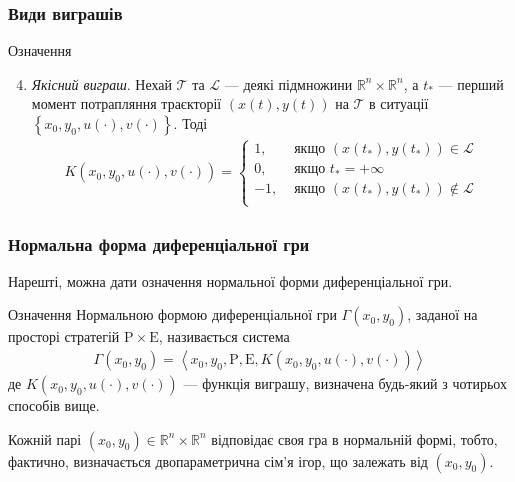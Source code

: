 \documentclass[10pt,pdf,aspectratio=169]{beamer}
\newcommand{\R}{\mathbb{R}}
\newcommand{\T}{\mathcal{T}}
\renewcommand{\l}{\left}
\renewcommand{\r}{\right}
\begin{document}
    \begin{frame}
        \frametitle{Види виграшів}
    
        \begin{block}{Означення}
            \begin{enumerate}
                \setcounter{enumi}{3}
                \item \emph{Якісний виграш}. Нехай $\T$ та $\mathcal{L}$ --- деякі підмножини $\R^n \times \R^n$, а $t_*$ --- перший момент потрапляння траєкторії $(x(t), y(t))$ на $\T$
                в ситуації $\l\{x_0, y_0, u(\cdot), v(\cdot) \r\}$. Тоді
                \begin{gather*}
                    K(x_0, y_0, u(\cdot), v(\cdot)) = \begin{cases}
                        1, & \text{ якщо } (x(t_*), y(t_*)) \in \mathcal{L} \\
                        0, & \text{ якщо } t_* = +\infty \\
                        -1, & \text{ якщо } (x(t_*), y(t_*)) \notin \mathcal{L} \\
                    \end{cases}
                \end{gather*}
            \end{enumerate}
        \end{block}
    \end{frame}
    \begin{frame}
        \frametitle{Нормальна форма диференціальної гри}
    
        Нарешті, можна дати означення нормальної форми диференціальної гри.

        \begin{block}{Означення}
            Нормальною формою диференціальної гри $\Gamma (x_0, y_0)$, заданої на просторі стратегій $\mathrm{P} \times \mathrm{E}$, називається система
            \begin{gather*}
                \Gamma (x_0, y_0) = \l<x_0, y_0, \mathrm {P}, \mathrm{E}, K(x_0, y_0, u(\cdot), v(\cdot)) \r>
            \end{gather*}
            де $K(x_0, y_0, u(\cdot), v(\cdot))$ --- функція виграшу, визначена будь-який з чотирьох способів вище.
        \end{block}

        Кожній парі $(x_0, y_0) \in \R^n \times \R^n$ відповідає своя гра в нормальній формі, тобто, фактично,
        визначається двопараметрична сім'я ігор, що залежать від $(x_0, y_0)$.
    \end{frame}
\end{document}
